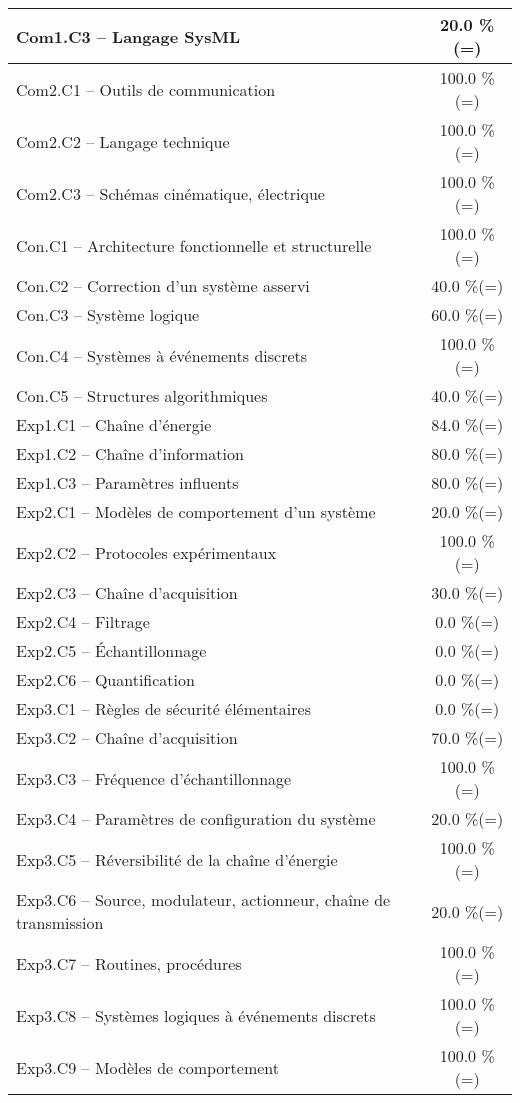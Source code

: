 \begin{center}
\begin{tabular}{|p{.7\linewidth}|c|}
Com1.C3 -- Langage SysML&20.0 \%(=)\\ \hline 
Com2.C1 -- Outils de communication&100.0 \%(=)\\ \hline 
Com2.C2 -- Langage technique&100.0 \%(=)\\ \hline 
Com2.C3 -- Schémas cinématique, électrique&100.0 \%(=)\\ \hline 
Con.C1 -- Architecture fonctionnelle et structurelle&100.0 \%(=)\\ \hline 
Con.C2 -- Correction d’un système asservi&40.0 \%(=)\\ \hline 
Con.C3 -- Système logique&60.0 \%(=)\\ \hline 
Con.C4 -- Systèmes à événements discrets&100.0 \%(=)\\ \hline 
Con.C5 -- Structures algorithmiques&40.0 \%(=)\\ \hline 
Exp1.C1 -- Chaîne d’énergie&84.0 \%(=)\\ \hline 
Exp1.C2 -- Chaîne d’information&80.0 \%(=)\\ \hline 
Exp1.C3 -- Paramètres influents&80.0 \%(=)\\ \hline 
Exp2.C1 -- Modèles de comportement d’un système&20.0 \%(=)\\ \hline 
Exp2.C2 -- Protocoles expérimentaux&100.0 \%(=)\\ \hline 
Exp2.C3 -- Chaîne d’acquisition&30.0 \%(=)\\ \hline 
Exp2.C4 -- Filtrage&0.0 \%(=)\\ \hline 
Exp2.C5 -- Échantillonnage&0.0 \%(=)\\ \hline 
Exp2.C6 -- Quantification&0.0 \%(=)\\ \hline 
Exp3.C1 -- Règles de sécurité élémentaires&0.0 \%(=)\\ \hline 
Exp3.C2 -- Chaîne d'acquisition&70.0 \%(=)\\ \hline 
Exp3.C3 -- Fréquence d’échantillonnage&100.0 \%(=)\\ \hline 
Exp3.C4 -- Paramètres de configuration du système&20.0 \%(=)\\ \hline 
Exp3.C5 -- Réversibilité de la chaîne d’énergie&100.0 \%(=)\\ \hline 
Exp3.C6 -- Source, modulateur, actionneur, chaîne de transmission&20.0 \%(=)\\ \hline 
Exp3.C7 -- Routines, procédures &100.0 \%(=)\\ \hline 
Exp3.C8 -- Systèmes logiques à événements discrets&100.0 \%(=)\\ \hline 
Exp3.C9 -- Modèles de comportement&100.0 \%(=)\\ \hline 

\end{tabular}
\end{center}
